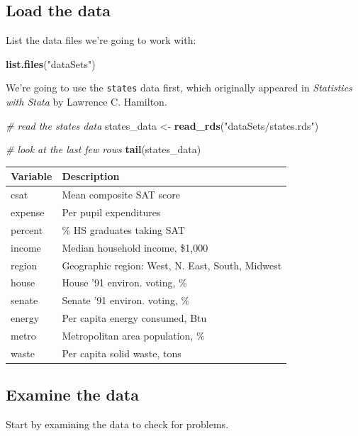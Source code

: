 \documentclass[
]{book}
\newenvironment{Shaded}{\begin{snugshade}}{\end{snugshade}}
\newcommand{\CommentTok}[1]{\textcolor[rgb]{0.56,0.35,0.01}{\textit{#1}}}
\newcommand{\KeywordTok}[1]{\textcolor[rgb]{0.13,0.29,0.53}{\textbf{#1}}}
\newcommand{\NormalTok}[1]{#1}
\newcommand{\StringTok}[1]{\textcolor[rgb]{0.31,0.60,0.02}{#1}}
\begin{document}
\hypertarget{load-the-data}{%
\subsection{Load the data}\label{load-the-data}}

List the data files we're going to work with:

\begin{Shaded}
\begin{Highlighting}[]
\KeywordTok{list.files}\NormalTok{(}\StringTok{"dataSets"}\NormalTok{)}
\end{Highlighting}
\end{Shaded}

We're going to use the \texttt{states} data first, which originally appeared in \emph{Statistics with Stata} by Lawrence C. Hamilton.

\begin{Shaded}
\begin{Highlighting}[]
  \CommentTok{# read the states data}
\NormalTok{  states_data <-}\StringTok{ }\KeywordTok{read_rds}\NormalTok{(}\StringTok{"dataSets/states.rds"}\NormalTok{) }

  \CommentTok{# look at the last few rows}
  \KeywordTok{tail}\NormalTok{(states_data)}
\end{Highlighting}
\end{Shaded}

\begin{longtable}[]{@{}ll@{}}
\toprule
Variable & Description\tabularnewline
\midrule
\endhead
csat & Mean composite SAT score\tabularnewline
expense & Per pupil expenditures\tabularnewline
percent & \% HS graduates taking SAT\tabularnewline
income & Median household income, \$1,000\tabularnewline
region & Geographic region: West, N. East, South, Midwest\tabularnewline
house & House '91 environ. voting, \%\tabularnewline
senate & Senate '91 environ. voting, \%\tabularnewline
energy & Per capita energy consumed, Btu\tabularnewline
metro & Metropolitan area population, \%\tabularnewline
waste & Per capita solid waste, tons\tabularnewline
\bottomrule
\end{longtable}

\hypertarget{examine-the-data}{%
\subsection{Examine the data}\label{examine-the-data}}

Start by examining the data to check for problems.
\end{document}
